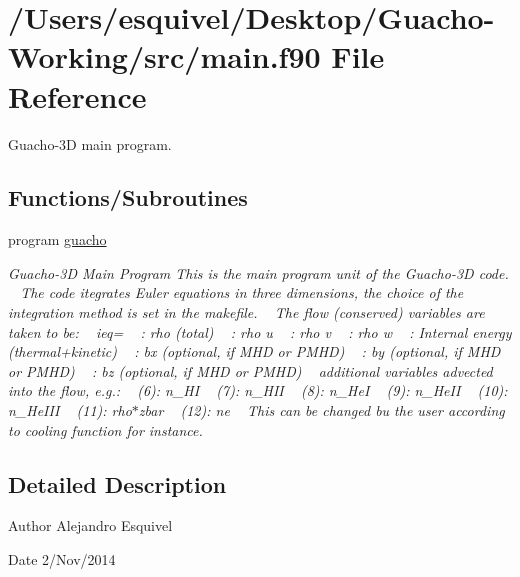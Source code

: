 \hypertarget{main_8f90}{}\section{/\+Users/esquivel/\+Desktop/\+Guacho-\/\+Working/src/main.f90 File Reference}
\label{main_8f90}


Guacho-\/3\+D main program.  


\subsection*{Functions/\+Subroutines}
\begin{DoxyCompactItemize}
\item 
\hypertarget{main_8f90_a685bddead5d9dcd4492c9cf9c60614a5}{}program \hyperlink{main_8f90_a685bddead5d9dcd4492c9cf9c60614a5}{guacho}\label{main_8f90_a685bddead5d9dcd4492c9cf9c60614a5}

\begin{DoxyCompactList}\small\item\em Guacho-\/3\+D Main Program This is the main program unit of the Guacho-\/3\+D code. ~\newline
 The code itegrates Euler equations in three dimensions, the choice of the integration method is set in the makefile. ~\newline
 The flow (conserved) variables are taken to be\+: ~\newline
 ieq= ~ \+: rho (total) ~ \+: rho u ~ \+: rho v ~ \+: rho w ~ \+: Internal energy (thermal+kinetic) ~ \+: bx (optional, if M\+H\+D or P\+M\+H\+D) ~ \+: by (optional, if M\+H\+D or P\+M\+H\+D) ~ \+: bz (optional, if M\+H\+D or P\+M\+H\+D) ~\newline
 additional variables advected into the flow, e.\+g.\+: ~ (6)\+: n\+\_\+\+H\+I ~ (7)\+: n\+\_\+\+H\+I\+I ~ (8)\+: n\+\_\+\+He\+I ~ (9)\+: n\+\_\+\+He\+I\+I ~ (10)\+: n\+\_\+\+He\+I\+I\+I ~ (11)\+: rho$\ast$zbar ~ (12)\+: ne ~\newline
 This can be changed bu the user according to cooling function for instance. \end{DoxyCompactList}\end{DoxyCompactItemize}


\subsection{Detailed Description}
\begin{DoxyAuthor}{Author}
Alejandro Esquivel 
\end{DoxyAuthor}
\begin{DoxyDate}{Date}
2/\+Nov/2014 
\end{DoxyDate}
